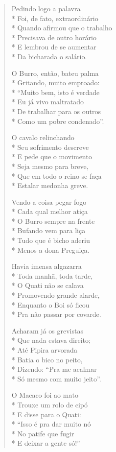 \begin{verse}
Pedindo logo a palavra\\*
Foi, de fato, extraordinário\\*
Quando afirmou que o trabalho \\*
Precisava de outro horário\\*
E lembrou de se aumentar \\*
Da bicharada o salário.

O Burro, então, bateu palma\\*
Gritando, muito emproado:\\*
“Muito bem, isto é verdade\\*
Eu já vivo maltratado\\*
De trabalhar para os outros\\*
Como um pobre condenado”.

O cavalo relinchando\\*
Seu sofrimento descreve\\*
E pede que o movimento\\*
Seja mesmo para breve,\\*
Que em todo o reino se faça\\*
Estalar medonha greve.

Vendo a coisa pegar fogo\\*
Cada qual melhor atiça\\*
O Burro sempre na frente\\*
Bufando vem para liça\\*
Tudo que é bicho aderiu\\*
Menos a dona Preguiça.

Havia imensa algazarra\\*
Toda manhã, toda tarde,\\*
O Quati não se calava\\*
Promovendo grande alarde,\\*
Enquanto o Boi só ficou\\*
Pra não passar por covarde.

Acharam já os grevistas\\*
Que nada estava direito;\\*
Até Pipira arvorada\\*
Batia o bico no peito,\\*
Dizendo: “Pra me acalmar\\*
Só mesmo com muito jeito”.

O Macaco foi ao mato\\*
Trouxe um rolo de cipó\\*
E disse para o Quati:\\*
“Isso é pra dar muito nó\\*
No patife que fugir\\*
E deixar a gente só!”


\end{verse}
